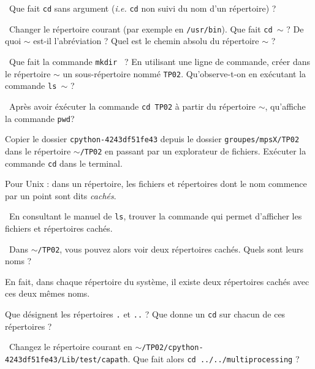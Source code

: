 \medskip

\question\ Que fait \texttt{cd} sans argument (\emph{i.e.} \texttt{cd} non
  suivi du nom d'un répertoire) ?

\question\ Changer le répertoire courant (par exemple en \texttt{/usr/bin}). Que fait \texttt{cd }$\sim$ ?  De 
quoi $\sim$ est-il l'abréviation ? Quel est le chemin absolu du répertoire $\sim$ ?

\medskip

\question\ Que fait la commande \texttt{mkdir } ? En utilisant une ligne de commande, créer dans le répertoire $\sim$ un sous-répertoire nommé \texttt{TP02}. Qu'observe-t-on en exécutant la commande \texttt{ls }$\sim$ ? 

\medskip

\question\ Après avoir éxécuter la commande \texttt{cd TP02} à partir du répertoire $\sim$, qu'affiche la commande
  \texttt{pwd}?
  
\medskip  

Copier le dossier \texttt{cpython-4243df51fe43} depuis le dossier \texttt{groupes/mpsX/TP02} dans le répertoire $\sim$\texttt{/TP02} en passant par un explorateur de fichiers. Exécuter la commande \texttt{cd} dans le terminal. 


\medskip 

Pour Unix : dans un répertoire, les fichiers et répertoires dont le nom
commence par un point sont dits \emph{cachés}.

\medskip

\question\ {En consultant le manuel de \texttt{ls}, trouver la commande qui
permet d'afficher les fichiers et répertoires cachés.}

\medskip

\question\ Dans $\sim$\texttt{/TP02}, vous pouvez alors voir deux
  répertoires cachés. Quels sont leurs noms ? 
  
\medskip

En fait, dans chaque répertoire du système, il existe deux répertoires cachés
avec ces deux mêmes noms.

\medskip

\question{} Que désignent les répertoires \texttt{.} et \texttt{..} ?
Que donne un \texttt{cd} sur chacun de ces répertoires ?

\medskip

\question\ Changez le répertoire courant en 
$\sim$\texttt{/TP02/cpython-4243df51fe43/Lib/test/capath}. Que
fait   alors \texttt{cd ../../multiprocessing} ?

